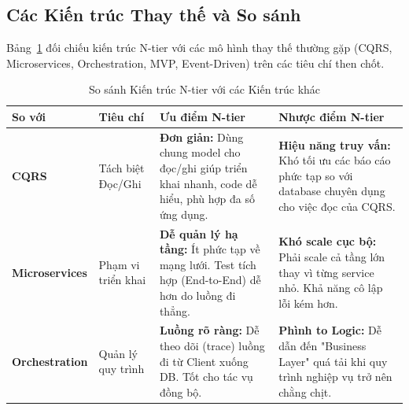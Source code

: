 \subsection{Các Kiến trúc Thay thế và So sánh}

Bảng~\ref{tab:arch-alt-comparison} đối chiếu kiến trúc N-tier với các mô hình thay thế thường gặp (CQRS, Microservices, Orchestration, MVP, Event-Driven) trên các tiêu chí then chốt.

\begin{table}[H]
    \centering
    \caption{So sánh Kiến trúc N-tier với các Kiến trúc khác}
    \label{tab:arch-alt-comparison}
    \vspace{0.3cm}
    \renewcommand{\arraystretch}{1.5} %
    
    \begin{tabularx}{\textwidth}{ 
        | >{\hsize=0.8\hsize\RaggedRight\arraybackslash}X 
        | >{\hsize=0.6\hsize\RaggedRight\arraybackslash}X 
        | >{\hsize=1.3\hsize\RaggedRight\arraybackslash}X 
        | >{\hsize=1.3\hsize\RaggedRight\arraybackslash}X | }
        
        \hline
        \textbf{So với} & \textbf{Tiêu chí} & \textbf{Ưu điểm N-tier} & \textbf{Nhược điểm N-tier} \\  
        \hline

        \textbf{CQRS} & 
        Tách biệt Đọc/Ghi & 
        \textbf{Đơn giản:} Dùng chung model cho đọc/ghi giúp triển khai nhanh, code dễ hiểu, phù hợp đa số ứng dụng. & 
        \textbf{Hiệu năng truy vấn:} Khó tối ưu các báo cáo phức tạp so với database chuyên dụng cho việc đọc của CQRS. \\  
        \hline

        \textbf{Microservices} & 
        Phạm vi triển khai & 
        \textbf{Dễ quản lý hạ tầng:} Ít phức tạp về mạng lưới. Test tích hợp (End-to-End) dễ hơn do luồng đi thẳng. & 
        \textbf{Khó scale cục bộ:} Phải scale cả tầng lớn thay vì từng service nhỏ. Khả năng cô lập lỗi kém hơn. \\  
        \hline

        \textbf{Orchestration} & 
        Quản lý quy trình & 
        \textbf{Luồng rõ ràng:} Dễ theo dõi (trace) luồng đi từ Client xuống DB. Tốt cho tác vụ đồng bộ. & 
        \textbf{Phình to Logic:} Dễ dẫn đến "Business Layer" quá tải khi quy trình nghiệp vụ trở nên chằng chịt. \\  
        \hline


\end{tabularx}
\end{table}
